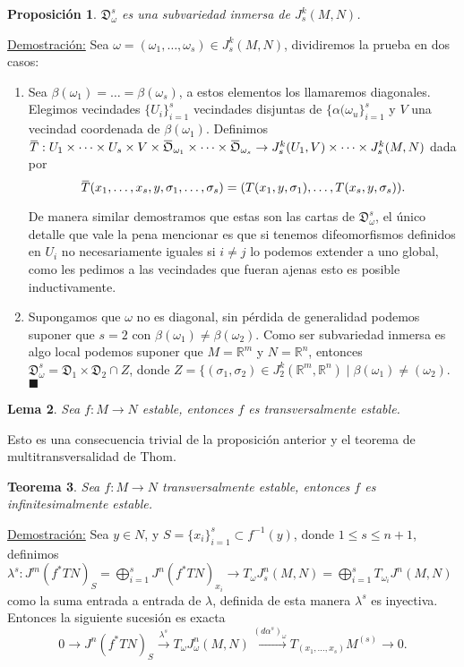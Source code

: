 \documentclass{report}
\newtheorem{theorem}{Teorema}[section]
\newtheorem{prop}[theorem]{Proposici\'on}
\newtheorem{lem}[theorem]{Lema}
\theoremstyle{definition}
\newcommand{\overbar}[1]{\mkern 1.5mu\overline{\mkern-1.5mu#1\mkern-1.5mu}\mkern 1.5mu}
\begin{document}
\begin{prop}
$\mathfrak{D}_\omega^s$ es una subvariedad inmersa de $J^k_s(M,N)$.
\end{prop}
\underline{Demostraci\'on:} Sea $\omega= (\omega_1, \dots, \omega_s) \in J^k_s(M,N)$, dividiremos la prueba en dos casos: \begin{enumerate}
\item Sea $\beta (\omega_1) = \dots = \beta (\omega_s)$, a estos elementos los llamaremos diagonales. Elegimos vecindades $\{U_i \}_{i=1}^s$ vecindades disjuntas de $\{ \alpha(\omega_u \}_{i=1}^s$ y $V$ una vecindad coordenada de $\beta(\omega_1)$. Definimos $\overbar{T}: U_1 \times \dots \times U_s \times V \times \overbar{\mathfrak{O}}_{\omega_1} \times \dots \times \overbar{\mathfrak{O}}_{\omega_s} \to J^k_s (U_1, V) \times \dots \times J^k_s(M,N)$ dada por $$\overbar{T} (x_1 , \dots , x_s , y , \sigma_1, \dots , \sigma_s)= (T(x_1 , y , \sigma_1) , \dots , T(x_s , y , \sigma_s)) .$$

De manera similar demostramos que estas son las cartas de $\mathfrak{D}_\omega^s$, el \'unico detalle que vale la pena mencionar es que si tenemos difeomorfismos definidos en $U_i$ no necesariamente iguales si $i\neq j$ lo podemos extender a uno global, como les pedimos a las vecindades que fueran ajenas esto es posible inductivamente.

\item Supongamos que $\omega$ no es diagonal, sin p\'erdida de generalidad podemos suponer que $s=2$ con $\beta (\omega_1) \neq \beta (\omega_2)$. Como ser subvariedad inmersa es algo local podemos suponer que $M= \mathbb{R}^m$ y $N = \mathbb{R}^n$, entonces $\mathfrak{D}_\omega^s = \mathfrak{D}_1 \times \mathfrak{D}_2  \cap Z$, donde $Z= \{ (\sigma_1 , \sigma_2) \in J^k_2 (\mathbb{R}^m,\mathbb{R}^n) \mid \beta (\omega_1) \neq (\omega_2)$. $\blacksquare$
\end{enumerate}

\begin{lem}
Sea $f: M \to N$ estable, entonces $f$ es transversalmente estable.
\end{lem}

Esto es una consecuencia trivial de la proposici\'on anterior y el teorema de multitransversalidad de Thom.

\begin{theorem}
Sea $f: M \to N$ transversalmente estable, entonces $f$ es infinitesimalmente estable.
\end{theorem}

\underline{Demostraci\'on:} Sea $y \in N$, y $S= \{ x_i \}_{i=1}^s \subset f^{-1}(y)$, donde $1 \leq s \leq n+1$, definimos $\lambda^s :J^m(f^\ast TN)_S = \bigoplus\limits_{i=1}^s J^n (f^\ast TN)_{x_i} \to T_\omega J^n_s (M,N)= \bigoplus\limits_{i=1}^s T_{\omega_i} J^n(M,N)$ como la suma entrada a entrada de $\lambda$, definida de esta manera $\lambda^s$ es inyectiva. Entonces la siguiente sucesi\'on es exacta
$$0 \to J^n(f^\ast TN)_S \overset{\lambda^s}{\to} T_\omega J^n_\omega(M,N) \overset{(d\alpha^s)_\omega}{\to} T_{(x_1, \dots , x_s)} M^{(s)} \to 0.$$
\end{document}
